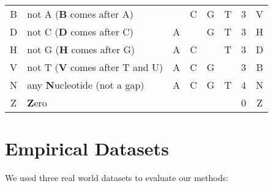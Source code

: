 \begin{table}[htb]
{\begin{center}
\begin{tabular}{c|l|cccc|c|c}
    \hline
    B & not A (\textbf{B} comes after A) &  & \rb{} C & \rb{} G & \rb{} T & 3 & V \\
    D & not C (\textbf{D} comes after C) & \rb{} A &  & \rb{} G & \rb{} T & 3 & H \\
    H & not G (\textbf{H} comes after G) & \rb{} A & \rb{} C &  & \rb{} T & 3 & D \\
    V & not T (\textbf{V} comes after T and U) & \rb{} A & \rb{} C & \rb{} G &  & 3 & B \\
    \hline
    N & any \textbf{N}ucleotide (not a gap) & \rb{} A & \rb{} C & \rb{} G & \rb{} T & 4 & N \\
    Z & \textbf{Z}ero &  &  &  &  & 0 & Z
    \end{tabular}
    \end{center}
}
\end{table}


\chapter{Empirical Datasets}
\label{ch:EmpiricalDatasets}


We used three %
real world datasets to evaluate our methods:

